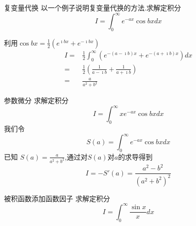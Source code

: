 \documentclass[fontset=windows, chinese, 10pt]{beamer}
\begin{document}
  \begin{frame}{复变量代换}
  \small
以一个例子说明复变量代换的方法.求解定积分
$$
    I =  \int_0^{\infty} e^{-a x} \cos b x d x 
$$

利用$\cos{bx} = \frac{1}{2}\left( e^{\imath b x} + e^{-\imath bx}\right)$
\[    
\begin{aligned}
    I= & \frac{1}{2} \int_{0}^{\infty} \left(e^{-(a-\imath b) x} + e^{-(a + \imath b) x} \right)  d x \\
    = & \frac{1}{2} \left( \frac{1}{a-\imath b} +  \frac{1}{a+\imath b} \right)\\
    = & \frac{a}{a^2+b^2}
\end{aligned}
\]
\end{frame}

  \begin{frame}{参数微分}
  \small
求解定积分
$$
    I =  \int_0^{\infty} x e^{-a x} \cos b x d x 
$$
我们令
$$
  S(a) =   \int_0^{\infty} e^{-a x} \cos b x d x 
$$
已知 $S(a) = \frac{a}{a^2+b^2}$,通过对$S(a)$对$a$的求导得到
$$
    I = - S'(a)  = \frac{a^2 - b^2}{(a^2 +b^2)^2}    
$$
  \end{frame}
  

  \begin{frame}{被积函数添加函数因子}
 求解定积分
\[
    I =  \int_0^{\infty} \frac{\sin{x}}{x} d x 
\]


  \end{frame}
\end{document}
